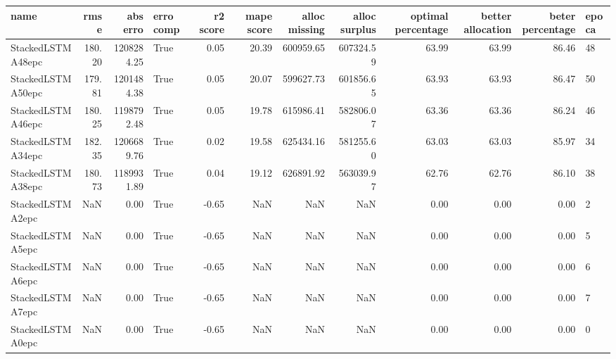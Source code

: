 \begin{tabular}{lrrlrrrrrrrl}
\toprule
name & rmse & abs erro & erro comp & r2 score & mape score & alloc missing & alloc surplus & optimal percentage & better allocation & beter percentage & epoca \\
\midrule
StackedLSTMA48epc & 180.20 & 1208284.25 & True & 0.05 & 20.39 & 600959.65 & 607324.59 & 63.99 & 63.99 & 86.46 & 48 \\
StackedLSTMA50epc & 179.81 & 1201484.38 & True & 0.05 & 20.07 & 599627.73 & 601856.65 & 63.93 & 63.93 & 86.47 & 50 \\
StackedLSTMA46epc & 180.25 & 1198792.48 & True & 0.05 & 19.78 & 615986.41 & 582806.07 & 63.36 & 63.36 & 86.24 & 46 \\
StackedLSTMA34epc & 182.35 & 1206689.76 & True & 0.02 & 19.58 & 625434.16 & 581255.60 & 63.03 & 63.03 & 85.97 & 34 \\
StackedLSTMA38epc & 180.73 & 1189931.89 & True & 0.04 & 19.12 & 626891.92 & 563039.97 & 62.76 & 62.76 & 86.10 & 38 \\
StackedLSTMA2epc & NaN & 0.00 & True & -0.65 & NaN & NaN & NaN & 0.00 & 0.00 & 0.00 & 2 \\
StackedLSTMA5epc & NaN & 0.00 & True & -0.65 & NaN & NaN & NaN & 0.00 & 0.00 & 0.00 & 5 \\
StackedLSTMA6epc & NaN & 0.00 & True & -0.65 & NaN & NaN & NaN & 0.00 & 0.00 & 0.00 & 6 \\
StackedLSTMA7epc & NaN & 0.00 & True & -0.65 & NaN & NaN & NaN & 0.00 & 0.00 & 0.00 & 7 \\
StackedLSTMA0epc & NaN & 0.00 & True & -0.65 & NaN & NaN & NaN & 0.00 & 0.00 & 0.00 & 0 \\
\bottomrule
\end{tabular}
